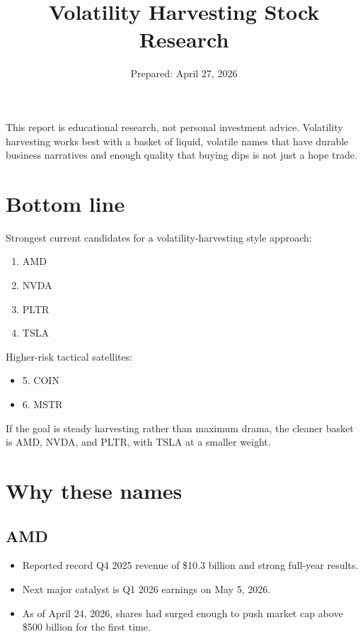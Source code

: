 \documentclass[11pt]{article}
\title{Volatility Harvesting Stock Research}
\author{}
\date{Prepared: April 27, 2026}
\begin{document}
\maketitle

This report is educational research, not personal investment advice. Volatility harvesting works best with a basket of liquid, volatile names that have durable business narratives and enough quality that buying dips is not just a hope trade.

\section*{Bottom line}

Strongest current candidates for a volatility-harvesting style approach:

\begin{enumerate}
  \item AMD
  \item NVDA
  \item PLTR
  \item TSLA
\end{enumerate}

Higher-risk tactical satellites:

\begin{itemize}
  \item 5. COIN
  \item 6. MSTR
\end{itemize}

If the goal is steady harvesting rather than maximum drama, the cleaner basket is AMD, NVDA, and PLTR, with TSLA at a smaller weight.

\section*{Why these names}

\subsection*{AMD}

\begin{itemize}
  \item Reported record Q4 2025 revenue of \$10.3 billion and strong full-year results.
  \item Next major catalyst is Q1 2026 earnings on May 5, 2026.
  \item As of April 24, 2026, shares had surged enough to push market cap above \$500 billion for the first time.
\end{itemize}
\end{document}
